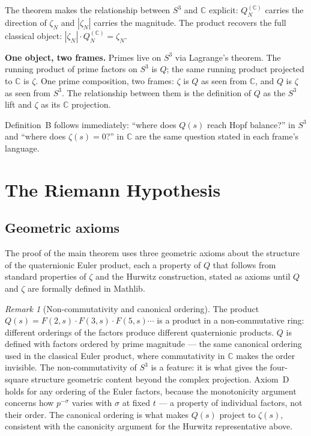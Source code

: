 \documentclass[12pt,a4paper]{article}
\theoremstyle{definition}
\theoremstyle{remark}
\newtheorem{remark}[theorem]{Remark}
\begin{document}
The theorem makes the relationship between $S^3$ and $\mathbb{C}$ explicit:
$Q_N^{(\mathbb{C})}$ carries the direction of $\zeta_N$ and $|\zeta_N|$
carries the magnitude. The product recovers the full classical object:
$|\zeta_N| \cdot Q_N^{(\mathbb{C})} = \zeta_N$.

\medskip
\noindent\textbf{One object, two frames.} Primes live on $S^3$ via
Lagrange's theorem. The running product of prime factors on $S^3$ is $Q$;
the same running product projected to $\mathbb{C}$ is $\zeta$. One prime
composition, two frames: $\zeta$ is $Q$ as seen from $\mathbb{C}$, and $Q$
is $\zeta$ as seen from $S^3$. The relationship between them is the
definition of $Q$ as the $S^3$ lift and $\zeta$ as its $\mathbb{C}$
projection.

Definition~B follows immediately: ``where does $Q(s)$ reach Hopf balance?''
in $S^3$ and ``where does $\zeta(s) = 0$?'' in $\mathbb{C}$ are the same
question stated in each frame's language.

\section{The Riemann Hypothesis}

\subsection{Geometric axioms}

The proof of the main theorem uses three geometric axioms about the structure
of the quaternionic Euler product, each a property of $Q$ that follows from
standard properties of $\zeta$ and the Hurwitz construction, stated as axioms
until $Q$ and $\zeta$ are formally defined in Mathlib.

\begin{remark}[Non-commutativity and canonical ordering]
The product $Q(s) = F(2,s) \cdot F(3,s) \cdot F(5,s) \cdots$ is a product
in a non-commutative ring: different orderings of the factors produce different
quaternionic products. $Q$ is defined with factors ordered by prime magnitude
--- the same canonical ordering used in the classical Euler product, where
commutativity in $\mathbb{C}$ makes the order invisible. The non-commutativity
of $S^3$ is a feature: it is what gives the four-square structure geometric
content beyond the complex projection. Axiom~D holds for any ordering of the
Euler factors, because the monotonicity argument concerns how $p^{-\sigma}$
varies with $\sigma$ at fixed $t$ --- a property of individual factors, not
their order. The canonical ordering is what makes $Q(s)$ project to $\zeta(s)$,
consistent with the canonicity argument for the Hurwitz representative above.
\end{remark}
\end{document}
